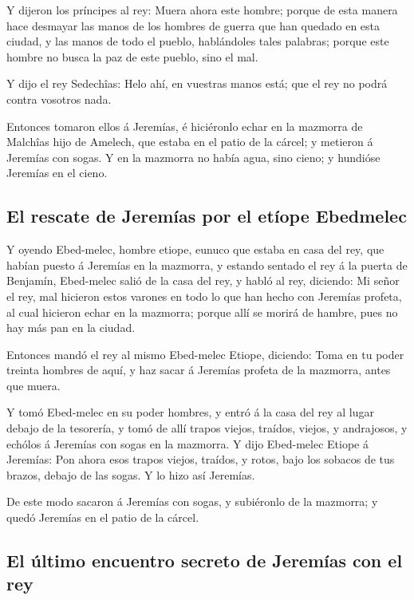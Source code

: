  Y dijeron los príncipes al rey: Muera ahora este hombre;
porque de esta manera hace desmayar las manos de los hombres de guerra
que han quedado en esta ciudad, y las manos de todo el pueblo,
hablándoles tales palabras; porque este hombre no busca la paz de este
pueblo, sino el mal.

 Y dijo el rey Sedechîas: Helo ahí, en vuestras manos
está; que el rey no podrá contra vosotros nada.

 Entonces tomaron ellos á Jeremías, é hiciéronlo echar en
la mazmorra de Malchîas hijo de Amelech, que estaba en el patio de la
cárcel; y metieron á Jeremías con sogas. Y en la mazmorra no había agua,
sino cieno; y hundióse Jeremías en el cieno.

\hypertarget{el-rescate-de-jeremuxedas-por-el-etuxedope-ebedmelec}{%
\subsection{El rescate de Jeremías por el etíope
Ebedmelec}\label{el-rescate-de-jeremuxedas-por-el-etuxedope-ebedmelec}}

 Y oyendo Ebed-melec, hombre etiope, eunuco que estaba en
casa del rey, que habían puesto á Jeremías en la mazmorra, y estando
sentado el rey á la puerta de Benjamín,  Ebed-melec salió
de la casa del rey, y habló al rey, diciendo:  Mi señor el
rey, mal hicieron estos varones en todo lo que han hecho con Jeremías
profeta, al cual hicieron echar en la mazmorra; porque allí se morirá de
hambre, pues no hay más pan en la ciudad.

 Entonces mandó el rey al mismo Ebed-melec Etiope,
diciendo: Toma en tu poder treinta hombres de aquí, y haz sacar á
Jeremías profeta de la mazmorra, antes que muera.

 Y tomó Ebed-melec en su poder hombres, y entró á la casa
del rey al lugar debajo de la tesorería, y tomó de allí trapos viejos,
traídos, viejos, y andrajosos, y echólos á Jeremías con sogas en la
mazmorra.  Y dijo Ebed-melec Etiope á Jeremías: Pon ahora
esos trapos viejos, traídos, y rotos, bajo los sobacos de tus brazos,
debajo de las sogas. Y lo hizo así Jeremías.

 De este modo sacaron á Jeremías con sogas, y subiéronlo
de la mazmorra; y quedó Jeremías en el patio de la cárcel.

\hypertarget{el-uxfaltimo-encuentro-secreto-de-jeremuxedas-con-el-rey}{%
\subsection{El último encuentro secreto de Jeremías con el
rey}\label{el-uxfaltimo-encuentro-secreto-de-jeremuxedas-con-el-rey}}

